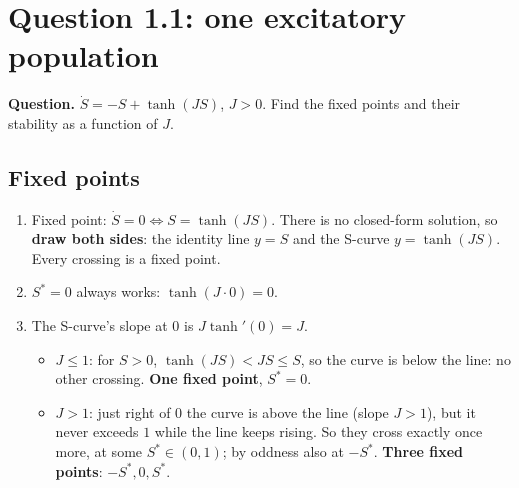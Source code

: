 \section{Question 1.1: one excitatory population}

\begin{center}
\end{center}

\textbf{Question.} $\dot S=-S+\tanh(JS)$, $J>0$. Find the fixed points and their stability as a function of $J$.

\subsection{Fixed points}
\begin{enumerate}
  \item Fixed point: $\dot S=0\iff S=\tanh(JS)$. There is no closed-form solution, so \textbf{draw both sides}: the identity line $y=S$ and the S-curve $y=\tanh(JS)$. Every crossing is a fixed point.
  \item $S^*=0$ always works: $\tanh(J\cdot0)=0$.
  \item The S-curve's slope at $0$ is $J\tanh'(0)=J$.
        \begin{itemize}
          \item $J\le1$: for $S>0$, $\tanh(JS)<JS\le S$, so the curve is below the line: no other crossing. \textbf{One fixed point}, $S^*=0$.
          \item $J>1$: just right of $0$ the curve is above the line (slope $J>1$), but it never exceeds $1$ while the line keeps rising. So they cross exactly once more, at some $S^*\in(0,1)$; by oddness also at $-S^*$. \textbf{Three fixed points}: $-S^*,0,S^*$.
        \end{itemize}
\end{enumerate}

